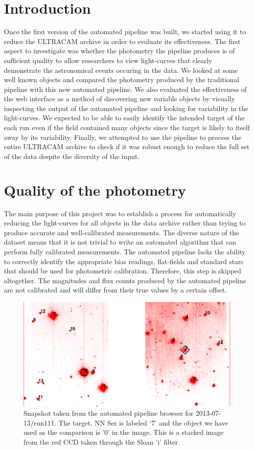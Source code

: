 \section{Introduction}
Once the first version of the automated pipeline was built, we started using it to reduce the ULTRACAM archive in order to evaluate its effectiveness. The first aspect to investigate was whether the photometry the pipeline produces is of sufficient quality to allow researchers to view light-curves that clearly demonstrate the astronomical events occuring in the data. We looked at some well known objects and compared the photometry produced by the traditional pipeline with this new automated pipeline. We also evaluated the effectiveness of the web interface as a method of discovering new variable objects by visually inspecting the output of the automated pipeline and looking for variability in the light-curves. We expected to be able to easily identify the intended target of the each run even if the field contained many objects since the target is likely to itself away by its variability. Finally, we attempted to use the pipeline to process the entire ULTRACAM archive to check if it was robust enough to reduce the full set of the data despite the diversity of the input. 

\section{Quality of the photometry}
The main purpose of this project was to establish a process for automatically reducing the light-curves for all objects in the data archive rather than trying to produce accurate and well-calibrated measurements. The diverse nature of the dataset means that it is not trivial to write an automated algorithm that can perform fully calibrated measurements. The automated pipeline lacks the ability to correctly identify the appropriate bias readings, flat-fields and standard stars that should be used for photometric calibration. Therefore, this step is skipped altogether. The magnitudes and flux counts produced by the automated pipeline are not calibrated and will differ from their true values by a certain offset. 

\begin{figure}
\centering
\includegraphics[width=120mm]{images/2013-07-13-run111-r-withlabels.png}
\caption{Snapshot taken from the automated pipeline browser for 2013-07-13/run111. The target, {NN Ser} is labeled `7' and the object we have used as the comparison is  '0' in the image. This is a stacked image from the red CCD taken through the Sloan 'i' filter. }
\label{fig:nnserfield}
\end{figure}

